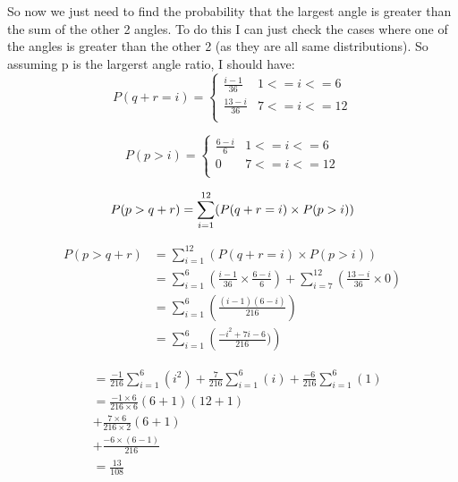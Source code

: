 \documentclass{article}
\begin{document}
So now we just need to find the probability that the largest
angle is greater than the sum of the other 2 angles. To do
this I can just check the cases where one of the angles is
greater than the other 2 (as they are all same distributions).
So assuming p is the largerst angle ratio, I should have:
\[ 
    P(q+r=i) = 
    \begin{cases}
        \frac{i-1}{36}  & 1<=i<=6\\
        \frac{13-i}{36} & 7<=i<=12\\
    \end{cases} 
\]

\[ 
    P(p>i) = 
    \begin{cases}
        \frac{6-i}{6} & 1<=i<=6\\
        0             & 7<=i<=12\\
    \end{cases} 
\]

\[ 
    P(p>q+r) = \sum_{i=1}^{12} (P(q+r=i) \times P(p>i))\\
\]

\begin{align*}
    P(p>q+r) &= \sum_{i=1}^{12} (P(q+r=i) \times P(p>i))\\
    &= \sum_{i=1}^{6} 
        \left( \frac{i-1}{36}\times \frac{6-i}{6} \right)
    + \sum_{i=7}^{12}
        \left( \frac{13-i}{36}\times 0 \right)\\
    &= \sum_{i=1}^{6} 
        \left( \frac{(i-1)(6-i)}{216}\right)\\
    &= \sum_{i=1}^{6} 
        \left( \frac{-i^2+7i-6}{216})\right)
\end{align*}


\begin{align*}
    &= \frac{- 1}{216}\sum_{i=1}^{ 6} (i^2)
     + \frac{  7}{216}\sum_{i=1}^{ 6} (i)
     + \frac{- 6}{216}\sum_{i=1}^{ 6} (1)\\
    &= \frac{- 1\times 6}{216\times6}(6+1)(12+1)\\
    &+ \frac{  7\times 6}{216\times2}(6+1)\\
    &+ \frac{- 6\times (6-1)}{216}\\
    &= \frac{13}{108}
\end{align*}
\end{document}
